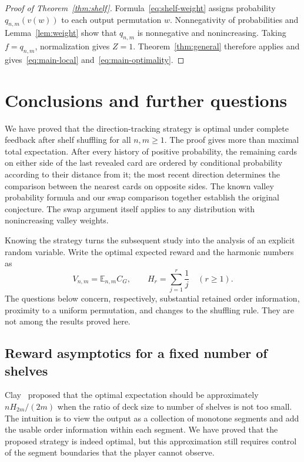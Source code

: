 \documentclass[11pt,reqno]{amsart}
\numberwithin{equation}{section}
\theoremstyle{definition}
\theoremstyle{remark}
\begin{document}
\begin{proof}[Proof of Theorem~\ref{thm:shelf}]
Formula~\eqref{eq:shelf-weight} assigns probability $q_{n,m}(v(w))$ to each output permutation $w$. Nonnegativity of probabilities and Lemma~\ref{lem:weight} show that $q_{n,m}$ is nonnegative and nonincreasing. Taking $f=q_{n,m}$, normalization gives $Z=1$. Theorem~\ref{thm:general} therefore applies and gives~\eqref{eq:main-local} and~\eqref{eq:main-optimality}.
\end{proof}
\section{Conclusions and further questions}\label{sec:conclusion}
We have proved that the direction-tracking strategy is optimal under complete feedback after shelf shuffling for all $n,m\ge1$. The proof gives more than maximal total expectation. After every history of positive probability, the remaining cards on either side of the last revealed card are ordered by conditional probability according to their distance from it; the most recent direction determines the comparison between the nearest cards on opposite sides. The known valley probability formula and our swap comparison together establish the original conjecture. The swap argument itself applies to any distribution with nonincreasing valley weights.

Knowing the strategy turns the subsequent study into the analysis of an explicit random variable. Write the optimal expected reward and the harmonic numbers as
\[
V_{n,m}=\mathbb E_{n,m}C_G,
\qquad H_r=\sum_{j=1}^{r}\frac1j\quad(r\ge1).
\]
The questions below concern, respectively, substantial retained order information, proximity to a uniform permutation, and changes to the shuffling rule. They are not among the results proved here.

\subsection{Reward asymptotics for a fixed number of shelves}
Clay~\cite[Section 6, Conjecture 3]{Clay} proposed that the optimal expectation should be approximately $nH_{2m}/(2m)$ when the ratio of deck size to number of shelves is not too small. The intuition is to view the output as a collection of monotone segments and add the usable order information within each segment. We have proved that the proposed strategy is indeed optimal, but this approximation still requires control of the segment boundaries that the player cannot observe.
\end{document}
